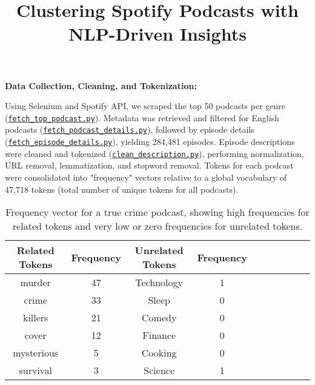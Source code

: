 \documentclass{article}
\makeatletter
\renewcommand{\maketitle}{
    \begin{center}
        \vspace{-2.3em} %
        {\LARGE \textbf{\@title} \par}
        \vspace{1em} %
        {\@author \par}
        \vspace{-1em} %
        \@date
    \end{center}
}
\makeatother
\begin{document}
\title{\textbf{Clustering Spotify Podcasts with NLP-Driven Insights}}
\author{}
\date{}

\maketitle
{} %

\noindent \textbf{Data Collection, Cleaning, and Tokenization:} 

\noindent Using Selenium and Spotify API, we scraped the top 50 podcasts per genre (\href{https://github.com/Stochastic1017/Spotify-Podcast-Clustering/blob/main/spotify_api/fetch_top_podcast.py}{\texttt{fetch\_top\_podcast.py}}). Metadata was retrieved and filtered for English podcasts (\href{https://github.com/Stochastic1017/Spotify-Podcast-Clustering/blob/main/spotify_api/fetch_podcast_details.py}{\texttt{fetch\_podcast\_details.py}}), followed by episode details (\href{https://github.com/Stochastic1017/Spotify-Podcast-Clustering/blob/main/spotify_api/fetch_episode_details.py}{\texttt{fetch\_episode\_details.py}}), yielding 284,481 episodes. Episode descriptions were cleaned and tokenized (\href{https://github.com/Stochastic1017/Spotify-Podcast-Clustering/blob/main/tokenization/clean_description.py}{\texttt{clean\_description.py}}), performing normalization, URL removal, lemmatization, and stopword removal. Tokens for each podcast were consolidated into "frequency" vectors relative to a global vocabulary of 47,718 tokens (total number of unique tokens for all podcasts).\\

\begin{table}[h!]
    \centering
    \begin{tabular}{|c|c|c|c|c|c|c|c|c|c|}
        \hline
        \textbf{Related Tokens} & \textbf{Frequency} & \textbf{Unrelated Tokens} & \textbf{Frequency} \\ \hline
        murder       & 47       & Technology & 1 \\ \hline
        crime        & 33        & Sleep      & 0 \\ \hline
        killers      & 21        & Comedy     & 0 \\ \hline
        cover        & 12        & Finance    & 0 \\ \hline
        mysterious   & 5        & Cooking    & 0 \\ \hline
        survival     & 3        & Science    & 1 \\ \hline
    \end{tabular}
    \caption{Frequency vector for a true crime podcast, showing high frequencies for related tokens and very low or zero frequencies for unrelated tokens.}
    \label{tab:frequency_vector}
\end{table}
\end{document}
